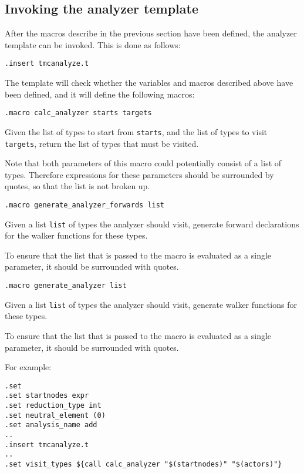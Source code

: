 \subsection{Invoking the analyzer template}
After the macros describe in the previous section have been defined,
the analyzer template can be invoked. This is done as follows:
\begin{verbatim}
.insert tmcanalyze.t
\end{verbatim}
The template will check whether the variables and macros described above
have been defined, and it will define the following macros:
\begin{verbatim}
.macro calc_analyzer starts targets
\end{verbatim}
\begin{desc}
Given the list of types to start from {\tt starts}, and the list of types
to visit {\tt targets}, return the list of types that must be visited.
\par
Note that both parameters of this macro could potentially consist of
a list of types. Therefore expressions for these parameters should be
surrounded by quotes, so that the list is not broken up.
\end{desc}
\begin{verbatim}
.macro generate_analyzer_forwards list
\end{verbatim}
\begin{desc}
Given a list {\tt list} of types the analyzer should visit, generate
forward declarations for the walker functions for these types.
\par
To ensure that the list that is passed to the macro is evaluated as
a single parameter, it should be surrounded with quotes.
\end{desc}
\begin{verbatim}
.macro generate_analyzer list
\end{verbatim}
\begin{desc}
Given a list {\tt list} of types the analyzer should visit, generate
walker functions for these types.
\par
To ensure that the list that is passed to the macro is evaluated as a
single parameter, it should be surrounded with quotes.
\end{desc}
For example:
\begin{verbatim}
.set 
.set startnodes expr
.set reduction_type int
.set neutral_element (0)
.set analysis_name add
..
.insert tmcanalyze.t
..
.set visit_types ${call calc_analyzer "$(startnodes)" "$(actors)"}
\end{verbatim}
